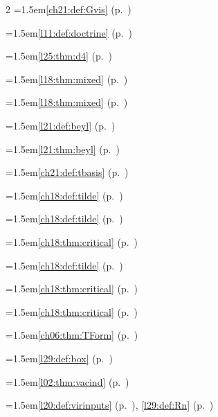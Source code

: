 \begin{multicols}{2}
\hangindent=1.5em\quad \ref{ch21:def:Gvis} (p.~\pageref{ch21:def:Gvis})\par
\hangindent=1.5em\quad \ref{l11:def:doctrine} (p.~\pageref{l11:def:doctrine})\par
\hangindent=1.5em\quad \ref{l25:thm:d4} (p.~\pageref{l25:thm:d4})\par
\hangindent=1.5em\quad \ref{l18:thm:mixed} (p.~\pageref{l18:thm:mixed})\par
\hangindent=1.5em\quad \ref{l18:thm:mixed} (p.~\pageref{l18:thm:mixed})\par
\hangindent=1.5em\quad \ref{l21:def:beyl} (p.~\pageref{l21:def:beyl})\par
\hangindent=1.5em\quad \ref{l21:thm:beyl} (p.~\pageref{l21:thm:beyl})\par
\hangindent=1.5em\quad \ref{ch21:def:tbasis} (p.~\pageref{ch21:def:tbasis})\par
\hangindent=1.5em\quad \ref{ch18:def:tilde} (p.~\pageref{ch18:def:tilde})\par
\hangindent=1.5em\quad \ref{ch18:def:tilde} (p.~\pageref{ch18:def:tilde})\par
\hangindent=1.5em\quad \ref{ch18:thm:critical} (p.~\pageref{ch18:thm:critical})\par
\hangindent=1.5em\quad \ref{ch18:def:tilde} (p.~\pageref{ch18:def:tilde})\par
\hangindent=1.5em\quad \ref{ch18:thm:critical} (p.~\pageref{ch18:thm:critical})\par
\hangindent=1.5em\quad \ref{ch18:thm:critical} (p.~\pageref{ch18:thm:critical})\par
\hangindent=1.5em\quad \ref{ch06:thm:TForm} (p.~\pageref{ch06:thm:TForm})\par
\hangindent=1.5em\quad \ref{l29:def:box} (p.~\pageref{l29:def:box})\par
\hangindent=1.5em\quad \ref{l02:thm:vacind} (p.~\pageref{l02:thm:vacind})\par
\hangindent=1.5em\quad \ref{l20:def:virinputs} (p.~\pageref{l20:def:virinputs}), \ref{l29:def:Rn} (p.~\pageref{l29:def:Rn})\par

\end{multicols}
